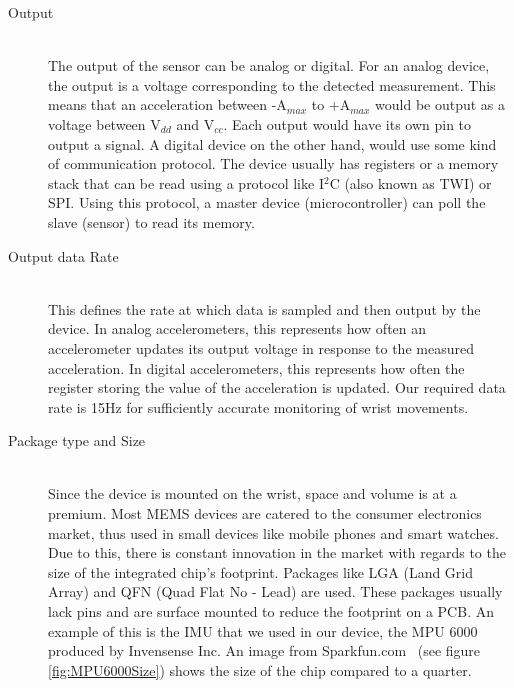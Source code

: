 \begin{description}

\item[Output] \hfill \\
The output of the sensor can be analog or digital. For an analog device, the output is a voltage corresponding to the detected measurement. This means that an acceleration between -A$_{max}$ to +A$_{max}$ would be output as a voltage between V$_{dd}$ and V$_{cc}$. Each output would have its own pin to output a signal. A digital device on the other hand, would use some kind of communication protocol. The device usually has registers or a memory stack that can be read using a protocol like I$^2$C (also known as TWI) or SPI. Using this protocol, a master device (microcontroller) can poll the slave (sensor) to read its memory.

\item[Output data Rate] \hfill \\
This defines the rate at which data is sampled and then output by the device.
In analog accelerometers,
this represents how often an accelerometer updates its output voltage in response to the measured acceleration.
In digital accelerometers,
this represents how often the register storing the value of the acceleration is updated.
Our required data rate is 15Hz for sufficiently accurate monitoring of wrist movements.

\item[Package type and Size] \hfill \\
Since the device is mounted on the wrist, space and volume is at a premium.
Most MEMS devices are catered to the consumer electronics market,
thus used in small devices like mobile phones and smart watches. Due to this,
there is constant innovation in the market with regards to the size of the integrated chip's footprint.
Packages like LGA (Land Grid Array) and QFN (Quad Flat No - Lead) are used.
These packages usually lack pins and are surface mounted to reduce the footprint on a PCB.
An example of this is the IMU that we used in our device, the MPU 6000 produced by Invensense Inc.
An image from Sparkfun.com~\cite{Image:SparkfunMPU6000}  (see figure \ref{fig:MPU6000Size}) shows the size of the chip compared to a quarter.


\end{description}
